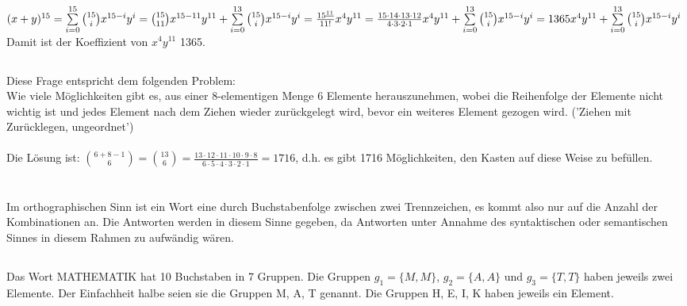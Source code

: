 \documentclass[fleqn]{article}
\begin{document}
\subsection{}%
\begin{math}
    (x + y)^{15} = \sum\limits_{i=0}^{15} {15 \choose i}x^{15-i}y^i
    = {15 \choose 11}x^{15-11}y^{11} + \sum\limits_{i=0}^{13} {15 \choose i}x^{15-i}y^i = \frac{15^{\underline{11}}}{11!}x^{4}y^{11}\\
    = \frac{15 \cdot 14 \cdot 13 \cdot 12}{4 \cdot 3 \cdot 2 \cdot 1}x^4y^{11} + \sum\limits_{i=0}^{13} {15 \choose i}x^{15-i}y^i = 1365 x^4y^{11} + \sum\limits_{i=0}^{13} {15 \choose i}x^{15-i}y^i\\
\end{math}
Damit ist der Koeffizient von $x^4y^{11}$ 1365.

\subsection{}%
Diese Frage entspricht dem folgenden Problem:\\
Wie viele Möglichkeiten gibt es, aus einer 8-elementigen Menge 6 Elemente herauszunehmen, wobei die Reihenfolge der Elemente nicht wichtig ist und jedes Element nach dem Ziehen wieder zurückgelegt wird, bevor ein weiteres Element gezogen wird. ('Ziehen mit Zurücklegen, ungeordnet')\\
\\
Die Lösung ist: ${6 + 8 - 1 \choose 6} = {13 \choose 6} = \frac{13 \cdot 12 \cdot 11 \cdot 10 \cdot 9 \cdot 8}{6 \cdot 5 \cdot 4 \cdot 3 \cdot 2 \cdot 1} = 1716$, d.h. es gibt 1716 Möglichkeiten, den Kasten auf diese Weise zu befüllen.

\section{}
Im orthographischen Sinn ist ein Wort eine durch Buchstabenfolge zwischen zwei Trennzeichen, es kommt also nur auf die Anzahl der Kombinationen an. Die Antworten werden in diesem Sinne gegeben, da Antworten unter Annahme des syntaktischen oder semantischen Sinnes in diesem Rahmen zu aufw\"andig w\"aren.

\subsection{}
Das Wort MATHEMATIK hat 10 Buchstaben in 7 Gruppen. Die Gruppen $g_1 = \{ M, M \}$, $g_2 = \{ A, A \}$ und $g_3 = \{ T, T \}$ haben jeweils zwei Elemente. Der Einfachheit halbe seien sie die Gruppen M, A, T genannt. Die Gruppen H, E, I, K haben jeweils ein Element.
\end{document}
